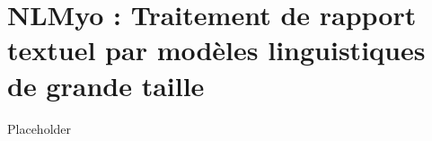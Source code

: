 \chapter{NLMyo : Traitement de rapport textuel par modèles linguistiques de grande taille}

Placeholder